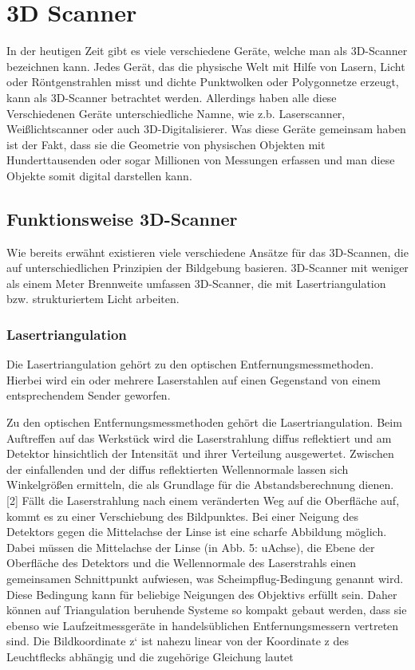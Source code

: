 \section{3D Scanner}
In der heutigen Zeit gibt es viele verschiedene Geräte, welche man als 3D-Scanner bezeichnen kann. Jedes Gerät, das die physische Welt mit Hilfe von Lasern, Licht oder Röntgenstrahlen misst und dichte Punktwolken oder Polygonnetze erzeugt, kann als 3D-Scanner betrachtet werden. Allerdings haben alle diese Verschiedenen Geräte unterschiedliche Namne, wie z.b. Laserscanner, Weißlichtscanner oder auch 3D-Digitalisierer. Was diese Geräte gemeinsam haben ist der Fakt, dass sie die Geometrie von physischen Objekten mit Hunderttausenden oder sogar Millionen von Messungen erfassen und man diese Objekte somit digital darstellen kann.

\subsection{Funktionsweise 3D-Scanner}
Wie bereits erwähnt existieren viele verschiedene Ansätze für das 3D-Scannen, die auf unterschiedlichen Prinzipien der Bildgebung basieren. 3D-Scanner mit weniger als einem Meter Brennweite umfassen 3D-Scanner, die mit Lasertriangulation bzw. strukturiertem Licht arbeiten.

\subsubsection{Lasertriangulation}
Die Lasertriangulation gehört zu den optischen Entfernungsmessmethoden. Hierbei wird ein oder mehrere Laserstahlen auf einen Gegenstand von einem entsprechendem Sender geworfen.

Zu den optischen Entfernungsmessmethoden gehört die Lasertriangulation. Beim Auftreffen auf das Werkstück wird die Laserstrahlung diffus reflektiert und am Detektor hinsichtlich der Intensität und ihrer Verteilung ausgewertet. Zwischen der einfallenden und der diffus reflektierten Wellennormale lassen sich Winkelgrößen ermitteln, die als Grundlage für die Abstandsberechnung dienen. [2] Fällt die Laserstrahlung nach einem veränderten Weg auf die Oberfläche auf, kommt es zu einer Verschiebung des Bildpunktes. Bei einer Neigung des Detektors gegen die Mittelachse der Linse ist eine scharfe Abbildung möglich. Dabei müssen die Mittelachse der Linse (in Abb. 5: uAchse), die Ebene der Oberfläche des Detektors und die Wellennormale des Laserstrahls einen gemeinsamen Schnittpunkt aufwiesen, was Scheimpflug-Bedingung genannt wird. Diese Bedingung kann für beliebige Neigungen des Objektivs erfüllt sein. Daher können auf Triangulation beruhende Systeme so kompakt gebaut werden, dass sie ebenso wie Laufzeitmessgeräte in handelsüblichen Entfernungsmessern vertreten sind. Die Bildkoordinate z‘ ist nahezu linear von der Koordinate z des Leuchtflecks abhängig und die zugehörige Gleichung lautet


